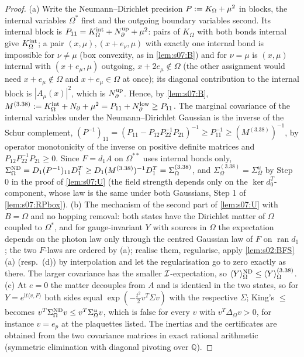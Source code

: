 \begin{proof}
(a) Write the Neumann--Dirichlet precision $P:= K_\Omega+\mu^2$ in blocks, the internal variables $\Omega^*$ first and the outgoing boundary variables second. Its internal block is $P_{11}=K^{\rm int}_\Omega+N^{\rm up}_\partial+\mu^2$: pairs of $K_\Omega$ with both bonds internal give $K^{\rm int}_\Omega$; a pair $(x,\mu),(x+e_\nu,\mu)$ with exactly one internal bond is impossible for $\nu\ne\mu$ (box convexity, as in \cref{lem:s07:B}) and for $\nu=\mu$ is $(x,\mu)$ internal with $(x+e_\mu,\mu)$ outgoing, \ie $x+2e_\mu\notin\Omega$ (the other assignment would need $x+e_\mu\notin\Omega$ and $x+e_\mu\in\Omega$ at once); its diagonal contribution to the internal block is $|A_\mu(x)|^2$, which is $N^{\rm up}_\partial$. Hence, by \cref{lem:s07:B}, $M^{(3.38)}:= K^{\rm int}_\Omega+N_\partial+\mu^2=P_{11}+N^{\rm low}_\partial\ge P_{11}$. The marginal covariance of the internal variables under the Neumann--Dirichlet Gaussian is the inverse of the Schur complement, $(P^{-1})_{11}=(P_{11}-P_{12}P_{22}^{-1}P_{21})^{-1}\ge P_{11}^{-1}\ge(M^{(3.38)})^{-1}$, by operator monotonicity of the inverse on positive definite matrices and $P_{12}P_{22}^{-1}P_{21}\ge0$. Since $F=d_1A$ on $\Omega^{**}$ uses internal bonds only, $\Sigma^{\mathrm{ND}}_\Omega=D_1(P^{-1})_{11}D_1^T\ge D_1(M^{(3.38)})^{-1}D_1^T=\Sigma^{(3.38)}_\Omega$, and $\Sigma^{(3.38)}_\Omega=\Sigma^u_\Omega$ by Step 0 in the proof of \cref{lem:s07:U} (the field strength depends only on the $\ker d_0^T$-component, whose law is the same under both Gaussians, Step 1 of \cref{lem:s07:RPbox}). (b) The mechanism of the second part of \cref{lem:s07:U} with $B=\Omega$ and no hopping removal: both states have the Dirichlet matter of $\Omega$ coupled to $\Omega^*$, and for gauge-invariant $Y$ with sources in $\Omega$ the expectation depends on the photon law only through the centred Gaussian law of $F$ on $\operatorname{ran}d_1$; the two $F$-laws are ordered by (a); realise them, regularise, apply \cref{lem:s02:BFS}(a) (resp.\ (d)) by interpolation and let the regularisation go to zero exactly as there. The larger covariance has the smaller $\mathcal I$-expectation, so $\langle Y\rangle^{\mathrm{ND}}_\Omega\le\langle Y\rangle^{(3.38)}_\Omega$. (c) At $e=0$ the matter decouples from $A$ and is identical in the two states, so for $Y=e^{\mathrm it\langle v,F\rangle}$ both sides equal $\exp(-\frac{t^2}2v^T\Sigma v)$ with the respective $\Sigma$; King's $\le$ becomes $v^T\Sigma^{\mathrm{ND}}_\Omega v\le v^T\Sigma^u_\Omega v$, which is false for every $v$ with $v^T\Delta_\Omega v>0$, for instance $v=e_p$ at the plaquettes listed. The inertias and the certificates are obtained from the two covariance matrices in exact rational arithmetic (symmetric elimination with diagonal pivoting over $\mathbb Q$).
\end{proof}

